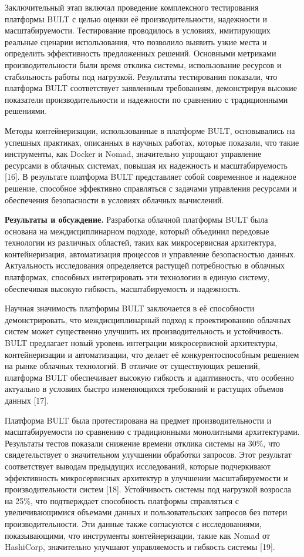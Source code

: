 \documentclass[
]{article}
\begin{document}
Заключительный этап включал проведение комплексного тестирования
платформы BULT с целью оценки её производительности, надежности и
масштабируемости. Тестирование проводилось в условиях, имитирующих
реальные сценарии использования, что позволило выявить узкие места и
определить эффективность предложенных решений. Основными метриками
производительности были время отклика системы, использование ресурсов и
стабильность работы под нагрузкой. Результаты тестирования показали, что
платформа BULT соответствует заявленным требованиям, демонстрируя
высокие показатели производительности и надежности по сравнению с
традиционными решениями.

Методы контейнеризации, использованные в платформе BULT, основывались на
успешных практиках, описанных в научных работах, которые показали, что
такие инструменты, как Docker и Nomad, значительно упрощают управление
ресурсами в облачных системах, повышая их надежность и масштабируемость
{[}16{]}. В результате платформа BULT представляет собой современное и
надежное решение, способное эффективно справляться с задачами управления
ресурсами и обеспечения безопасности в условиях облачных вычислений.

\textbf{Результаты и обсуждение.} Разработка облачной платформы BULT
была основана на междисциплинарном подходе, который объединил передовые
технологии из различных областей, таких как микросервисная архитектура,
контейнеризация, автоматизация процессов и управление безопасностью
данных. Актуальность исследования определяется растущей потребностью в
облачных платформах, способных интегрировать эти технологии в единую
систему, обеспечивая высокую гибкость, масштабируемость и надежность.

Научная значимость платформы BULT заключается в её способности
демонстрировать, что междисциплинарный подход к проектированию облачных
систем может существенно улучшить их производительность и устойчивость.
BULT предлагает новый уровень интеграции микросервисной архитектуры,
контейнеризации и автоматизации, что делает её конкурентоспособным
решением на рынке облачных технологий. В отличие от существующих
решений, платформа BULT обеспечивает высокую гибкость и адаптивность,
что особенно актуально в условиях быстро изменяющихся требований и
растущих объемов данных {[}17{]}.

Платформа BULT была протестирована на предмет производительности и
масштабируемости по сравнению с традиционными монолитными архитектурами.
Результаты тестов показали снижение времени отклика системы на 30\%, что
свидетельствует о значительном улучшении обработки запросов. Этот
результат соответствует выводам предыдущих исследований, которые
подчеркивают эффективность микросервисных архитектур в улучшении
масштабируемости и производительности систем {[}18{]}. Устойчивость
системы под нагрузкой возросла на 25\%, что подтверждает способность
платформы справляться с увеличивающимися объемами данных и
пользовательских запросов без потери производительности. Эти данные
также согласуются с исследованиями, показывающими, что инструменты
контейнеризации, такие как Nomad от HashiCorp, значительно улучшают
управляемость и гибкость системы {[}19{]}.
\end{document}
